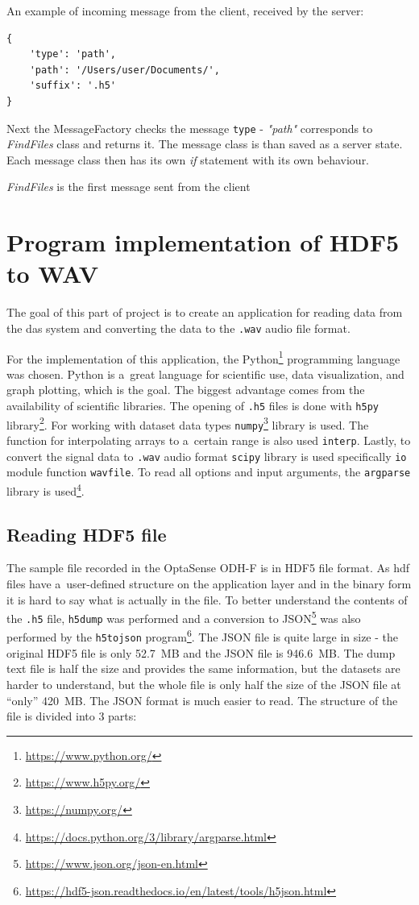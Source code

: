 An example of incoming message from the client, received by the server:
\begin{verbatim}
{
    'type': 'path',
    'path': '/Users/user/Documents/',
    'suffix': '.h5'
}
\end{verbatim}

Next the MessageFactory checks the message \verb|type| - \textit{"path"} corresponds to \textit{FindFiles} class and returns it. The message class is than saved as a server state. Each message class then has its own \textit{if} statement with its own behaviour.

\textit{FindFiles} is the first message sent from the client 

\section{Program implementation of HDF5 to WAV}\label{lab:hdftowav}\label{txt.implementation.wav}

The goal of this part of project is to create an application for reading data from the \ac{das} system and converting the data to the \verb|.wav| audio file format.

For the implementation of this application, the Python\footnote{\url{https://www.python.org/}} programming language was chosen. Python is a~great language for scientific use, data visualization, and graph plotting, which is the goal. The biggest advantage comes from the availability of scientific libraries. The opening of \verb |.h5| files is done with \verb|h5py| library\footnote{\url{https://www.h5py.org/}}. For working with dataset data types \verb|numpy|\footnote{\url{https://numpy.org/}} library is used. The function for interpolating arrays to a~certain range is also used \verb|interp|. Lastly, to convert the signal data to \verb|.wav| audio format \verb|scipy| library is used specifically \verb|io| module function \verb|wavfile|. To read all options and input arguments, the \verb|argparse| library is used\footnote{\url{https://docs.python.org/3/library/argparse.html}}.

\subsection{Reading HDF5 file}\label{txt.implementation.reading}

The sample file recorded in the OptaSense ODH-F is in HDF5 file format. As \ac{hdf} files have a~user-defined structure on the application layer and in the binary form it is hard to say what is actually in the file. To better understand the contents of the \verb|.h5| file, \verb|h5dump| was performed and a conversion to JSON\footnote{\url{https://www.json.org/json-en.html}} was also performed by the \verb|h5tojson| program\footnote{\url{https://hdf5-json.readthedocs.io/en/latest/tools/h5json.html}}. The JSON file is quite large in size - the original HDF5 file is only \qty{52,7}{MB} and the JSON file is \qty{946,6}{MB}. The dump text file is half the size and provides the same information, but the datasets are harder to understand, but the whole file is only half the size of the JSON file at ``only'' \qty{420}{MB}. The JSON format is much easier to read. The structure of the file is divided into 3 parts:

